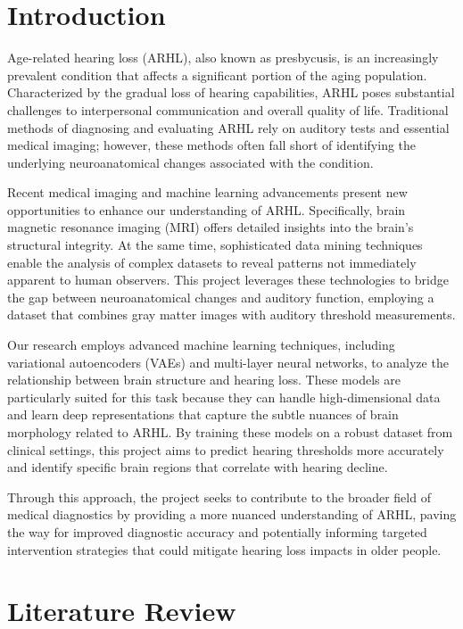 \documentclass[conference,compsoc]{IEEEtran}
\begin{document}
\IEEEpeerreviewmaketitle



\section{Introduction}

Age-related hearing loss (ARHL), also known as presbycusis, is an increasingly prevalent condition that affects a significant portion of the aging population. Characterized by the gradual loss of hearing capabilities, ARHL poses substantial challenges to interpersonal communication and overall quality of life. Traditional methods of diagnosing and evaluating ARHL rely on auditory tests and essential medical imaging; however, these methods often fall short of identifying the underlying neuroanatomical changes associated with the condition.

Recent medical imaging and machine learning advancements present new opportunities to enhance our understanding of ARHL. Specifically, brain magnetic resonance imaging (MRI) offers detailed insights into the brain's structural integrity. At the same time, sophisticated data mining techniques enable the analysis of complex datasets to reveal patterns not immediately apparent to human observers. This project leverages these technologies to bridge the gap between neuroanatomical changes and auditory function, employing a dataset that combines gray matter images with auditory threshold measurements.

Our research employs advanced machine learning techniques, including variational autoencoders (VAEs) and multi-layer neural networks, to analyze the relationship between brain structure and hearing loss. These models are particularly suited for this task because they can handle high-dimensional data and learn deep representations that capture the subtle nuances of brain morphology related to ARHL. By training these models on a robust dataset from clinical settings, this project aims to predict hearing thresholds more accurately and identify specific brain regions that correlate with hearing decline.

Through this approach, the project seeks to contribute to the broader field of medical diagnostics by providing a more nuanced understanding of ARHL, paving the way for improved diagnostic accuracy and potentially informing targeted intervention strategies that could mitigate hearing loss impacts in older people.

\section{Literature Review}
\end{document}
